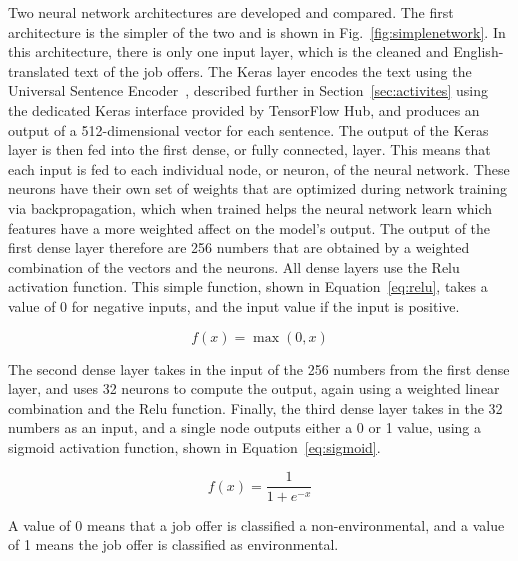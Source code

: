 Two neural network architectures are developed and compared. The first architecture is the simpler of the two and is shown in Fig.~\ref{fig:simplenetwork}. In this architecture, there is only one input layer, which is the  cleaned and English-translated text of the job offers. The Keras layer encodes the text using the Universal Sentence Encoder~\cite{DBLP:journals/corr/abs-1803-11175}, described further in Section~\ref{sec:activites} using the dedicated Keras interface provided by TensorFlow Hub, and produces an output of a 512-dimensional vector for each sentence. The output of the Keras layer is then fed into the first dense, or fully connected, layer. This means that each input is fed to each individual node, or neuron, of the neural network. These neurons have their own set of weights that are optimized during network training via backpropagation, which when trained helps the neural network learn which features have a more weighted affect on the model's output. The output of the first dense layer therefore are 256 numbers that are obtained by a weighted combination of the vectors and the neurons. All dense layers use the Relu activation function. This simple function, shown in Equation~\ref{eq:relu}, takes a value of 0 for negative inputs, and the input value if the input is positive. 

\begin{equation}
f(x) = \max(0, x)
\label{eq:relu}
\end{equation}

The second dense layer takes in the input of the 256 numbers from the first dense layer, and uses 32 neurons to compute the output, again using a weighted linear combination and the Relu function. Finally, the third dense layer takes in the 32 numbers as an input, and a single node outputs either a 0 or 1 value, using a sigmoid activation function, shown in Equation~\ref{eq:sigmoid}.

\begin{equation}
f(x) = \frac{1}{1+e^{-x}}
\label{eq:sigmoid}
\end{equation}

A value of 0 means that a job offer is classified a non-environmental, and a value of 1 means the job offer is classified as environmental.


